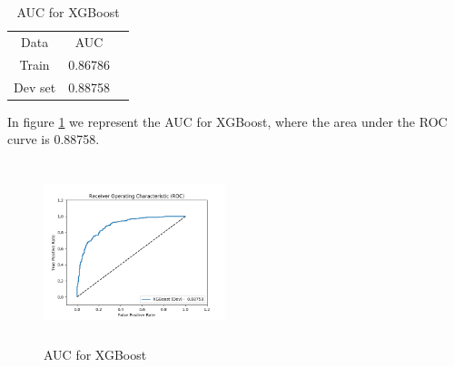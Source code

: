 \documentclass[conference]{IEEEtran}
\numberwithin{equation}{section}
\numberwithin{figure}{section}
\numberwithin{table}{section}
\begin{document}
\begin{table}[!htb]
\centering
\caption{AUC for XGBoost}
\label{tab_lr}
\begin{tabular}{ c c c }
                    \noalign{\smallskip}\hline\noalign{\smallskip}
                                Data  & AUC \\
                   \noalign{\smallskip}\hline\noalign{\smallskip}
                                Train & 0.86786\\
                                Dev set  & 0.88758\\                     
  \end{tabular}
\end{table}
 
In figure \ref{xgboost_fig} we represent the AUC for XGBoost, where the area under the ROC curve is 0.88758.
 
\begin{figure}
\centering
  \includegraphics[width=200px, height = 200px]{xgboost_dev}
  \caption{AUC for XGBoost}
  \label{xgboost_fig}
\end{figure}
\end{document}
